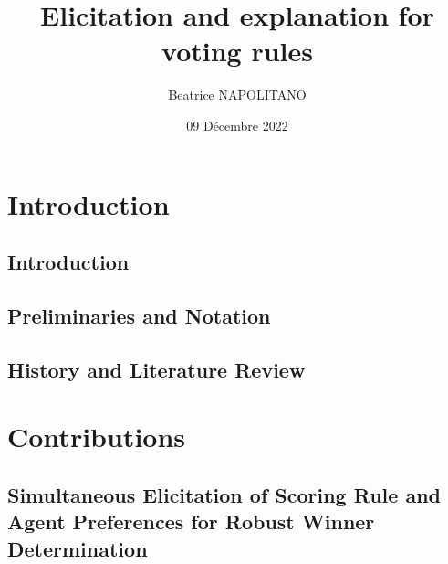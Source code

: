 \documentclass[a4paper, 11pt,oneside]{book}
\title{Elicitation and explanation for voting rules}
\author{Beatrice NAPOLITANO}
\institute{l'Université Paris-Dauphine}
\date{09 Décembre 2022}
\begin{document}
\hypersetup{pageanchor=false}
\begin{titlepage}
\maketitle{}
\end{titlepage}

\frontmatter

\begingroup
\hypersetup{hidelinks}

\tableofcontents

\listoffigures
{}

\listoftables
{}

\endgroup

\printglossary[toctitle=List of Abbreviations,title=List of Abbreviations,type=\acronymtype]

\mainmatter

\part{Introduction} 

	\chapter{Introduction}
		\label{ch:intro}
		
			
	\chapter{Preliminaries and Notation}
		\label{ch:preliminaries}
		
	
	\chapter{History and Literature Review}
		\label{ch:literature}
		
		
		
		
	
\part{Contributions}
	\label{part:contributions}

	\chapter[Simultaneous Elicitation of PSR and Agent Preferences]{Simultaneous Elicitation of Scoring Rule and Agent Preferences for Robust Winner Determination}
		\label{ch:minimax}
		
\end{document}
